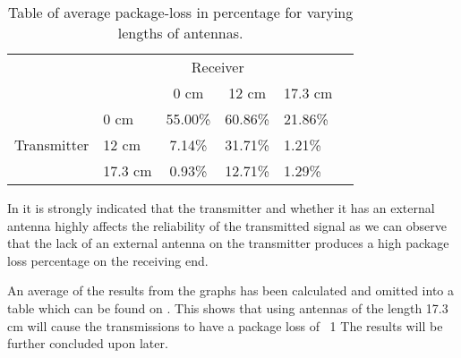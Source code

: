 \begin{table}[ht]
\centering
\caption{Table of average package-loss in percentage for varying lengths of antennas.}
\label{tbl:packageloss}
\begin{tabular}{llclll}
 & \multicolumn{4}{c}{Receiver} &    \hspace{40pt}      \\ \cline{2-5}
\multicolumn{1}{l|}{} & \multicolumn{1}{l|}{} & \multicolumn{1}{c|}{0 cm} & \multicolumn{1}{c|}{12 cm} & \multicolumn{1}{l|}{17.3 cm} &  \\ \cline{2-5}
\multicolumn{1}{l|}{} & \multicolumn{1}{l|}{0 cm} & \multicolumn{1}{c|}{55.00\%} & \multicolumn{1}{l|}{60.86\%} & \multicolumn{1}{l|}{21.86\%} &  \\ \cline{2-5}
\multicolumn{1}{l|}{Transmitter} & \multicolumn{1}{l|}{12 cm} & \multicolumn{1}{c|}{7.14\%} & \multicolumn{1}{l|}{31.71\%} & \multicolumn{1}{l|}{1.21\%} &  \\ \cline{2-5}
\multicolumn{1}{l|}{} & \multicolumn{1}{l|}{17.3 cm} & \multicolumn{1}{c|}{0.93\%} & \multicolumn{1}{l|}{12.71\%} & \multicolumn{1}{l|}{1.29\%} &  \\ \cline{2-5}
\end{tabular}
\end{table}

In  it is strongly indicated that the transmitter and whether it has an external antenna highly affects the reliability of the transmitted signal as we can observe that the lack of an external antenna on the transmitter produces a high package loss percentage on the receiving end.

An average of the results from the graphs has been calculated and omitted into a table which can be found on . 
This shows that using antennas of the length 17.3 cm will cause the transmissions to have a package loss of ~1%
The results will be further concluded upon later.

